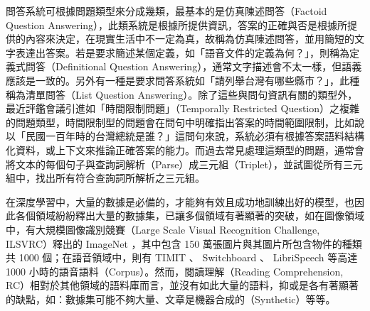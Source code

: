 問答系統可根據問題類型來分成幾類，最基本的是仿真陳述問答（Factoid Question Answering），此類系統是根據所提供資訊，答案的正確與否是根據所提供的內容來決定，在現實生活中不一定為真，故稱為仿真陳述問答，並用簡短的文字表達出答案。若是要求簡述某個定義，如「語音文件的定義為何？」，則稱為定義式問答（Definitional Question Answering），通常文字描述會不太一樣，但語義應該是一致的。另外有一種是要求問答系統如「請列舉台灣有哪些縣市？」，此種稱為清單問答（List Question Answering）。除了這些與問句資訊有關的類型外，最近評鑑會議引進如「時間限制問題」（Temporally Restricted Question）之複雜的問題類型，時間限制型的問題會在問句中明確指出答案的時間範圍限制，比如說以「民國一百年時的台灣總統是誰？」這問句來說，系統必須有根據答案語料結構化資料，或上下文來推論正確答案的能力。而過去常見處理這類型的問題，通常會將文本的每個句子與查詢詞解析（Parse）成三元組（Triplet），並試圖從所有三元組中，找出所有符合查詢詞所解析之三元組。

在深度學習中，大量的數據是必備的，才能夠有效且成功地訓練出好的模型，也因此各個領域紛紛釋出大量的數據集，已讓多個領域有著顯著的突破，如在圖像領域中，有大規模圖像識別競賽（Large Scale Visual Recognition Challenge, ILSVRC）釋出的 ImageNet \cite{imagenet_cvpr09} ，其中包含 150 萬張圖片與其圖片所包含物件的種類共 1000 個；在語音領域中，則有 TIMIT 、 Switchboard 、 LibriSpeech 等高達 1000 小時的語音語料（Corpus）。然而，閱讀理解（Reading Comprehension, RC）相對於其他領域的語料庫而言，並沒有如此大量的語料，抑或是各有著顯著的缺點，如：數據集可能不夠大量、文章是機器合成的（Synthetic）等等。

